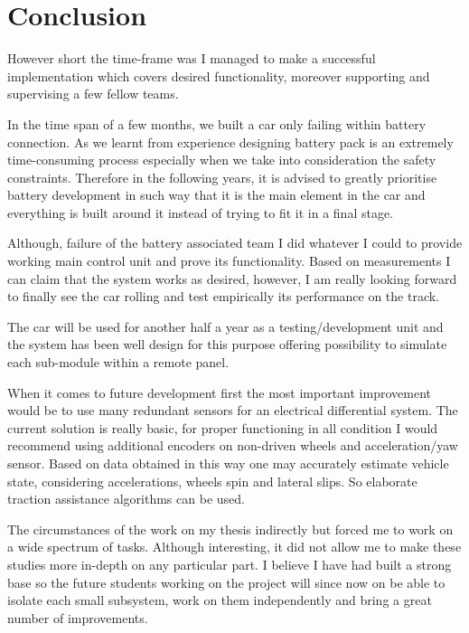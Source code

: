 \chapter{Conclusion}\label{total:chapters}
However short the time-frame was I managed to make a successful implementation which covers desired functionality, moreover supporting and supervising a few fellow teams. 

In the time span of a few months, we built a car only failing within battery connection. As we learnt from experience designing battery pack is an extremely time-consuming process especially when we take into consideration the safety constraints. Therefore in the following years, it is advised to greatly prioritise battery development in such way that it is the main element in the car and everything is built around it instead of trying to fit it in a final stage.

Although, failure of the battery associated team I did whatever I could to provide working main control unit and prove its functionality. Based on measurements I can claim that the system works as desired, however, I am really looking forward to finally see the car rolling and test empirically its performance on the track.

The car will be used for another half a year as a testing/development unit and the system has been well design for this purpose offering possibility to simulate each sub-module within a remote panel.

When it comes to future development first the most important improvement would be to use many redundant sensors for an electrical differential system. The current solution is really basic, for proper functioning in all condition I would recommend using additional encoders on non-driven wheels and acceleration/yaw sensor. Based on data obtained in this way one may accurately estimate vehicle state, considering accelerations, wheels spin and lateral slips. So elaborate traction assistance algorithms can be used.


The circumstances of the work on my thesis indirectly but forced me to work on a wide spectrum of tasks. Although interesting, it did not allow me to make these studies more in-depth on any particular part. 
I believe I have had built a strong base so the future students working on the project will since now on be able to isolate each small subsystem, work on them independently and bring a great number of improvements.